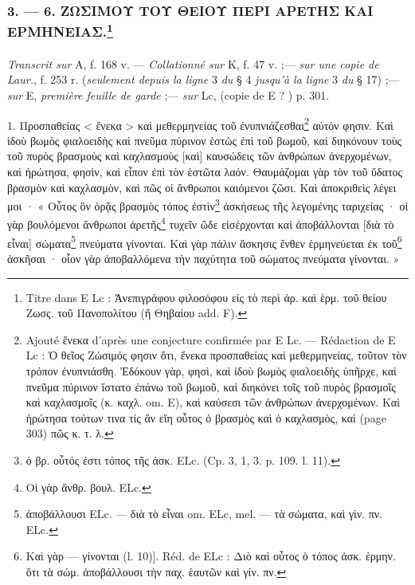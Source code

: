 \documentclass[a4paper, 11pt, oneside, polutonikogreek, french]{article}
\begin{document}
\subsubsection[3. --- 6. ΖΩΣΙΜΟΥ ΤΟΥ ΘΕΙΟΥ ΠΕΡΙ ΑΡΕΤΗΣ ΚΑΙ ΕΡΜΗΝΕΙΑΣ.]{3. --- 6. ΖΩΣΙΜΟΥ ΤΟΥ ΘΕΙΟΥ ΠΕΡΙ ΑΡΕΤΗΣ ΚΑΙ ΕΡΜΗΝΕΙΑΣ.\footnote{Titre dans E Lc : Ἀνεπιγράφου φιλοσόφου εἰς τὸ περὶ ἀρ. καὶ ἑρμ. τοῦ θείου Ζωσς. τοῦ Πανοπολίτου (ἤ Θηβαίου add. F).}}
\paragraph{}
\emph{Transcrit sur} A, f. 168 v. --- \emph{Collationné sur} K, f. 47 v. ;--- \emph{sur une copie de Laur.}, f. 253 r. (\emph{seulement depuis la ligne} 3 \emph{du} § 4 \emph{jusqu'à la ligne} 3 \emph{du} § 17) ;--- \emph{sur} E, \emph{première feuille de garde} ;--- \emph{sur} Lc, (copie de E ? ) p. 301.

\bigskip

1. Προσπαθείας < ἕνεκα > καὶ μεθερμηνείας τοῦ ἐνυπνιάζεσθαι\footnote{Ajouté ἕνεκα d'après une conjecture confirmée par E Lc. --- Rédaction de E Lc : Ὁ θεῖος Ζώσιμός φησιν ὅτι, ἕνεκα προσπαθείας καὶ μεθερμηνείας, τοῦτον τὸν τρόπον ἐνυπνιάσθη. Ἐδόκουν γὰρ, φησὶ, καὶ ἰδοὺ βωμὸς φιαλοειδὴς ὑπῆρχε, καὶ πνεῦμα πύρινον ἵστατο ἐπάνω τοῦ βωμοῦ, καὶ διηκόνει τοῖς τοῦ πυρὸς βρασμοῖς καὶ καχλασμοῖς (κ. καχλ. om. E), καὶ καύσεσι τῶν ἀνθρώπων ἀνερχομένων. Καὶ ἠρώτησα τούτων τινα τίς ἂν εἴη οὗτος ὁ βρασμὸς καὶ ὁ καχλασμὸς, καὶ (page 303) πῶς κ. τ. λ.} αὐτόν φησιν. Καὶ ἰδοὺ βωμὸς φιαλοειδὴς καὶ πνεῦμα πύρινον ἑστὼς ἐπὶ τοῦ βωμοῦ, καὶ διηκόνουν τοὺς τοῦ πυρὸς βρασμοὺς καὶ καχλασμοὺς [καὶ] καυσώδεις τῶν ἀνθρώπων ἀνερχομένων, καὶ ἠρώτησα, φησὶν, καὶ εἶπον ἐπὶ τὸν ἑστῶτα λαόν. Θαυμάζομαι γὰρ τὸν τοῦ ὕδατος βρασμὸν καὶ καχλασμὸν, καὶ πῶς οἱ ἄνθρωποι καιόμενοι ζῶσι. Καὶ ἀποκριθεὶς λέγει μοι · « Οὗτος ὃν ὁρᾷς βρασμὸς τόπος ἐστὶν\footnote{ὁ βρ. οὗτός ἐστι τόπος τῆς ἀσκ. ELc. (Cp. 3, 1, 3. p. 109. l. 11).} ἀσκήσεως τῆς λεγομένης ταριχείας · οἱ γὰρ βουλόμενοι ἄνθρωποι ἀρετῆς\footnote{Οἱ γὰρ ἄνθρ. βουλ. ELc.} τυχεῖν ῶδε εἰσέρχονται καὶ ἀποβάλλονται [διὰ τὸ εἶναι] σώματα\footnote{ἀποβάλλουσι ELc. --- διὰ τὸ εἶναι om. ELc, mel. --- τὰ σώματα, καὶ γὶν. πν. ELc.} πνεύματα γίνονται. Καὶ γὰρ πάλιν ἄσκησις ἔνθεν ἑρμηνεύεται ἐκ τοῦ\footnote{Καὶ γὰρ --- γίνονται (l. 10)]. Réd. de ELc : Διὸ καὶ οὗτος ὁ τόπος ἀσκ. ἑρμην. ὅτι τὰ σώμ. ἀποβάλλουσι τὴν παχ. ἑαυτῶν καὶ γίν. πν.} ἀσκῆσαι · οἷον γὰρ ἀποβαλλόμενα τὴν παχύτητα τοῦ σώματος πνεύματα γίνονται. »
\end{document}
